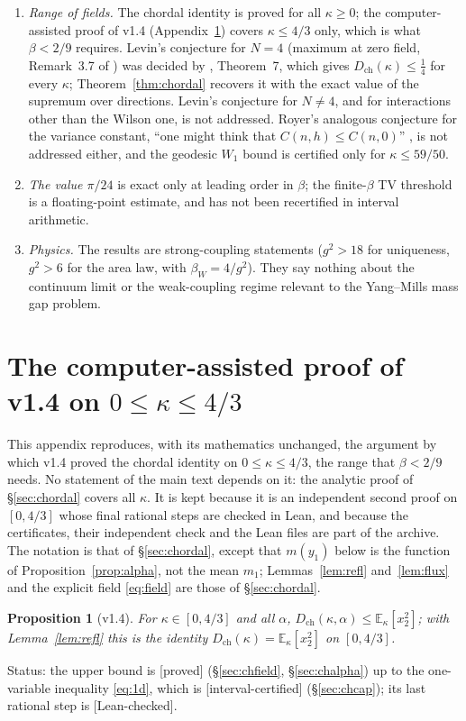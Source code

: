 \documentclass[11pt,a4paper]{article}
\newtheorem{proposition}[theorem]{Proposition}
\theoremstyle{remark}
\theoremstyle{definition}
\theoremstyle{plain}
\theoremstyle{remark}
\newcommand{\E}{\mathbb{E}}
\newcommand{\st}[1]{\textsf{[#1]}}
\newcommand{\Dch}{D_{\mathrm{ch}}}
\begin{document}
\begin{enumerate}
\item \emph{Range of fields.} The chordal identity is proved for all $\kappa\ge0$; the computer-assisted proof of v1.4 (Appendix~\ref{app:v14}) covers $\kappa\le4/3$ only, which is what $\beta<2/9$ requires.
Levin's conjecture for $N=4$ (maximum at zero field, Remark~3.7 of \cite{Lev80}) was decided by \cite{BB26}, Theorem~7, which gives $\Dch(\kappa)\le\frac14$ for every $\kappa$; Theorem~\ref{thm:chordal} recovers it with the exact value
of the supremum over directions. Levin's conjecture for $N\ne4$, and for interactions other than the Wilson one, is not addressed. Royer's analogous conjecture for the variance constant, ``one might think that $C(n,h)\leqslant C(n,0)$'' \cite[p.~38]{Roy86}, is not addressed either, and the geodesic $W_1$ bound is certified only for $\kappa\le59/50$.
\item \emph{The value $\pi/24$} is exact only at leading order in $\beta$; the finite-$\beta$ TV threshold is a
floating-point estimate, and has not been recertified in interval arithmetic.
\item \emph{Physics.} The results are strong-coupling statements ($g^2>18$ for uniqueness, $g^2>6$ for the area law, with $\beta_W=4/g^2$). They say nothing
about the continuum limit or the weak-coupling regime relevant to the Yang--Mills mass gap problem.
\end{enumerate}

\appendix
\section{The computer-assisted proof of v1.4 on $0\le\kappa\le4/3$}\label{app:v14}

This appendix reproduces, with its mathematics unchanged, the argument by which v1.4 proved the chordal identity on $0\le\kappa\le4/3$, the range that $\beta<2/9$ needs. No statement of the main text depends on it: the analytic proof of
\S\ref{sec:chordal} covers all $\kappa$. It is kept because it is an independent second proof on $[0,4/3]$ whose final rational steps are checked in Lean, and because the certificates, their independent check and the Lean files are part
of the archive. The notation is that of \S\ref{sec:chordal}, except that $m(y_1)$ below is the function of Proposition~\ref{prop:alpha}, not the mean $m_1$; Lemmas~\ref{lem:refl} and~\ref{lem:flux} and the explicit field \eqref{eq:field} are those of
\S\ref{sec:chordal}.

\begin{proposition}[v1.4]\label{prop:v14}
For $\kappa\in[0,4/3]$ and all $\alpha$, $\Dch(\kappa,\alpha)\le\E_\kappa[x_2^2]$; with Lemma~\ref{lem:refl} this is the identity $\Dch(\kappa)=\E_\kappa[x_2^2]$ on $[0,4/3]$.
\end{proposition}
\noindent Status: the upper bound is \st{proved} (\S\ref{sec:chfield}, \S\ref{sec:chalpha}) up to the one-variable inequality \eqref{eq:1d}, which is \st{interval-certified} (\S\ref{sec:chcap}); its last rational step is \st{Lean-checked}.
\end{document}
